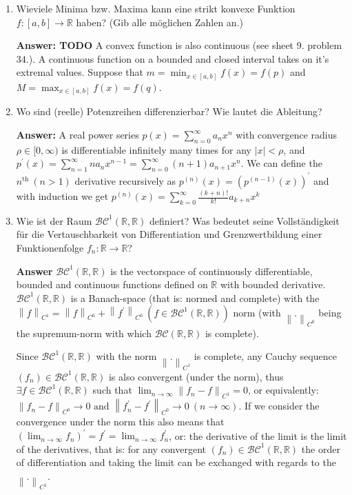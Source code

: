 \documentclass[11pt]{article}
\newcommand{\norm}[1]{\left\lVert#1\right\rVert}
\newcommand{\abs}[1]{\left|#1\right|}
\newcommand{\sumn}[4]{\sum_{#1=#2}^{#3}{#4}}
\newcommand{\RR}[0]{\mathbb{R}}
\begin{document}
\begin{enumerate}
    \item Wieviele Minima bzw. Maxima kann eine strikt konvexe Funktion $f\colon [a,b]\to\RR$ haben? (Gib alle möglichen Zahlen an.)
    
    \textbf{Answer: TODO} A convex function is also continuous (see sheet 9. problem 34.). A continuous function on a bounded and closed interval takes on it's extremal values. Suppose that $m = \min_{x\in[a,b]} f(x) = f(p)$ and $M = \max_{x\in[a,b]} f(x) = f(q)$. 
    \item Wo sind (reelle) Potenzreihen differenzierbar? Wie lautet die Ableitung?
    
    \textbf{Answer:} A real power series $p(x) = \sumn{n}{0}{\infty}{a_n x^n}$ with convergence radius $\rho \in [0, \infty)$ is differentiable infinitely many times for any $\abs{x} < \rho$, and $p^\prime(x) = \sumn{n}{1}{\infty}{n a_n x^{n-1}} = \sumn{n}{0}{\infty}{(n+1)a_{n+1}x^n}$. We can define the $n^{\text{th}}~(n > 1)$ derivative recursively as $p^{(n)}(x) = (p^{(n-1)}(x))^\prime$ and with induction we get $p^{(n)}(x) = \sumn{k}{0}{\infty}{\frac{(k+n)!}{k!}a_{k+n}x^k}$


    \item Wie ist der Raum $\mathcal{BC}^1(\RR,\RR)$ definiert? Was bedeutet seine Vollständigkeit für die Vertauschbarkeit von Differentiation und Grenzwertbildung einer Funktionenfolge $f_n\colon \RR\to\RR$?
    
    \textbf{Answer} $\mathcal{BC}^1(\RR,\RR)$ is the vectorspace of continuously differentiable, bounded and continuous functions defined on $\RR$ with bounded derivative. $\mathcal{BC}^1(\RR,\RR)$ is a Banach-space (that is: normed and complete) with the $\norm{f}_{C^1} = \norm{f}_{C^0} + \norm{f^\prime}_{C^0}~(f \in \mathcal{BC}^1(\RR,\RR))$ norm (with $\norm{.}_{C^0}$ being the supremum-norm with which $\mathcal{BC}(\RR,\RR)$ is complete). 

    Since $\mathcal{BC}^1(\RR,\RR)$ with the norm $\norm{.}_{C^1}$ is complete, any Cauchy sequence $(f_n) \in \mathcal{BC}^1(\RR,\RR)$ is also convergent (under the norm), thus $\exists f \in \mathcal{BC}^1(\RR,\RR)$ such that $\lim_{n\to\infty}\norm{f_n - f}_{C^1} = 0$, or equivalently: $\norm{f_n - f}_{C^0} \to 0 \text{ and } \norm{f^\prime_n - f^\prime}_{C^0} \to 0~(n\to\infty)$. If we consider the convergence under the norm this also means that $(\lim_{n\to\infty}f_n)^\prime = f^\prime = \lim_{n\to\infty}f^\prime_n$, or: the derivative of the limit is the limit of the derivatives, that is: for any convergent $(f_n) \in \mathcal{BC}^1(\RR,\RR)$ the order of differentiation and taking the limit can be exchanged with regards to the $\norm{.}_{C^1}$.


\end{enumerate}
\end{document}
